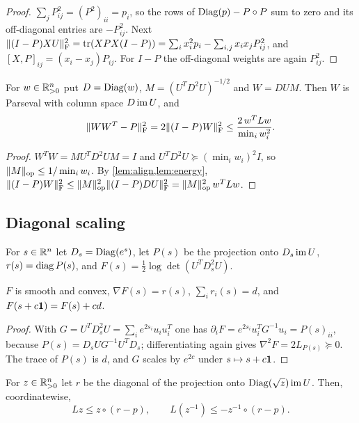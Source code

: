 \begin{proof}
$\sum_jP_{ij}^2=(P^2)_{ii}=p_i$, so the rows of $\operatorname{Diag}(p)-P\circ P$ sum to zero
and its off-diagonal entries are $-P_{ij}^2$. Next
$\lVert (I-P)XU\rVert_{\mathrm F}^2=\operatorname{tr}(XPX(I-P))=\sum_ix_i^2p_i-\sum_{i,j}x_ix_jP_{ij}^2$, and
$[X,P]_{ij}=(x_i-x_j)P_{ij}$. For $I-P$ the off-diagonal weights are again
$P_{ij}^2$.
\end{proof}

\begin{lemma}\label{lem:scaled}
For $w\in\mathbb R^n_{>0}$ put $D=\operatorname{Diag}(w)$, $M=(U^TD^2U)^{-1/2}$ and $W=DUM$. Then
$W$ is Parseval with column space $D\operatorname{im} U$, and
\[
 \lVert WW^T-P\rVert_{\mathrm F}^2=2\lVert (I-P)W\rVert_{\mathrm F}^2\le\frac{2\,w^TLw}{\min_iw_i^2} .
\]
\end{lemma}

\begin{proof}
$W^TW=MU^TD^2UM=I$ and $U^TD^2U\succeq(\min_iw_i)^2I$, so
$\lVert M\rVert_{\mathrm{op}}\le1/\min_iw_i$. By \cref{lem:align,lem:energy},
$\lVert (I-P)W\rVert_{\mathrm F}^2\le\lVert M\rVert_{\mathrm{op}}^2\lVert (I-P)DU\rVert_{\mathrm F}^2=\lVert M\rVert_{\mathrm{op}}^2\,w^TLw$.
\end{proof}

\subsection{Diagonal scaling}

For $s\in\mathbb R^n$ let $D_s=\operatorname{Diag}(e^{s})$, let $P(s)$ be the projection onto
$D_s\operatorname{im} U$, $r(s)=\operatorname{diag} P(s)$, and $F(s)=\frac12\log\det(U^TD_s^2U)$.

\begin{lemma}\label{lem:potential}
$F$ is smooth and convex, $\nabla F(s)=r(s)$, $\sum_ir_i(s)=d$, and
$F(s+c\mathbf 1)=F(s)+cd$.
\end{lemma}

\begin{proof}
With $G=U^TD_s^2U=\sum_ie^{2s_i}u_iu_i^T$ one has
$\partial_iF=e^{2s_i}u_i^TG^{-1}u_i=P(s)_{ii}$, because $P(s)=D_sUG^{-1}U^TD_s$;
differentiating again gives $\nabla^2F=2L_{P(s)}\succeq0$. The trace of $P(s)$ is
$d$, and $G$ scales by $e^{2c}$ under $s\mapsto s+c\mathbf 1$.
\end{proof}

\begin{lemma}\label{lem:scaling-ineq}
For $z\in\mathbb R^n_{>0}$ let $r$ be the diagonal of the projection onto
$\operatorname{Diag}(\sqrt z)\operatorname{im} U$. Then, coordinatewise,
\[
 Lz\le z\circ(r-p),\qquad L(z^{-1})\le-z^{-1}\circ(r-p).
\]
\end{lemma}

